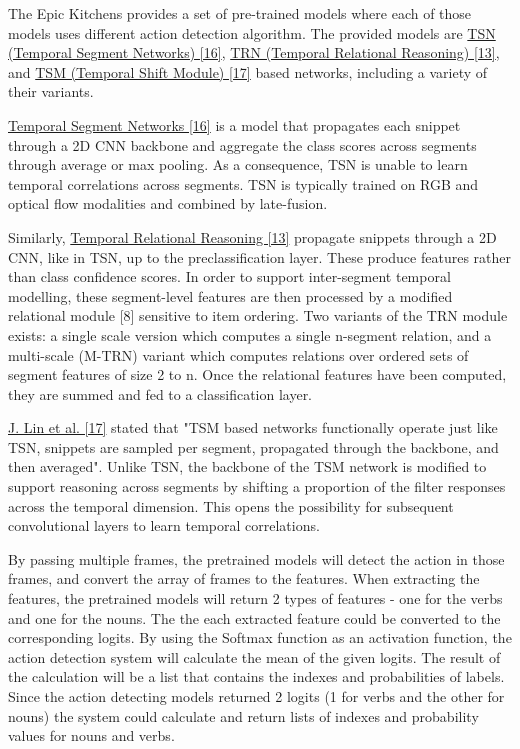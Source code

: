 \documentclass{article}
\begin{document}
The Epic Kitchens provides a set of pre-trained models where each of those models uses different action detection algorithm. The provided models are \hyperlink{ref16}{TSN (Temporal Segment Networks) [16]}, \hyperlink{ref13}{TRN (Temporal Relational Reasoning) [13]}, and \hyperlink{ref17}{TSM (Temporal Shift Module) [17]} based networks, including a variety of their variants.

\hyperlink{ref16}{Temporal Segment Networks [16]} is a model that propagates each snippet through a 2D CNN backbone and aggregate the class scores across segments through average or max pooling. As a consequence, TSN is unable to learn temporal correlations across segments. TSN is typically trained on RGB and optical flow modalities and combined by late-fusion.

Similarly, \hyperlink{ref13}{Temporal Relational Reasoning [13]} propagate snippets through a 2D CNN, like in TSN, up to the preclassification layer. These produce features rather than class confidence scores. In order to support inter-segment temporal modelling, these segment-level features are then processed by a modified relational module [8] sensitive to item ordering. Two variants of the TRN module exists: a single scale version which computes a single n-segment relation, and a multi-scale (M-TRN) variant which computes relations over ordered sets of segment features of size 2 to n. Once the relational features have been computed, they are summed and fed to a classification layer.

\hyperlink{ref17}{J. Lin et al. [17]} stated that "TSM based networks functionally operate just like TSN, snippets are sampled per segment, propagated through the backbone, and then averaged". Unlike TSN, the backbone of the TSM network is modified to support reasoning across segments by shifting a proportion of the filter responses across the temporal dimension. This opens the possibility for subsequent convolutional layers to learn temporal correlations.

By passing multiple frames, the pretrained models will detect the action in those frames, and convert the array of frames to the features. When extracting the features, the pretrained models will return 2 types of features - one for the verbs and one for the nouns. The the each extracted feature could be converted to the corresponding logits. By using the Softmax function as an activation function, the action detection system will calculate the mean of the given logits. The result of the calculation will be a list that contains the indexes and probabilities of labels. Since the action detecting models returned 2 logits (1 for verbs and the other for nouns) the system could calculate and return lists of indexes and probability values for nouns and verbs.
\end{document}
